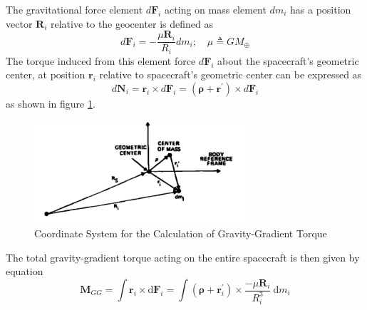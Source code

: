 The gravitational force element $d\mathbf{F}_i$ acting on mass element $dm_i$ has a position vector $\mathbf{R}_i$ relative to the geocenter is defined as
\begin{equation}
    d\mathbf{F}_i = -\frac{\mu \mathbf{R}_i}{R_i} dm_i; \quad \mu \triangleq GM_{\oplus} 
\end{equation}
The torque induced from this element force $d\mathbf{F}_i$ about the spacecraft's geometric center, at position $\mathbf{r}_i$ relative to spacecraft's geometric center can be expressed as
\begin{equation}
    d\mathbf{N}_i = \mathbf{r}_i \times d\mathbf{F}_i = (\boldsymbol{\rho} + \mathbf{r^{\prime}}) \times d\mathbf{F}_i
\end{equation}
as shown in figure \ref{fig:GG}.
\begin{figure}[H]
    \centering
    \includegraphics[width = 0.7\textwidth]{Figures/grav_grad.png}
    \caption{Coordinate System for the Calculation of Gravity-Gradient Torque}
    \label{fig:GG}
\end{figure}
The total gravity-gradient torque acting on the entire spacecraft is then given by equation
\begin{equation}
\mathbf{M}_{G G}=\int \mathbf{r}_{i} \times \mathrm{d} \mathbf{F}_{i}=\int\left(\boldsymbol{\rho}+\mathbf{r}_{i}^{\prime}\right) \times \frac{-\mu \mathbf{R}_{i}}{R_{i}^{3}} \mathrm{~d} m_{i}
\end{equation}


